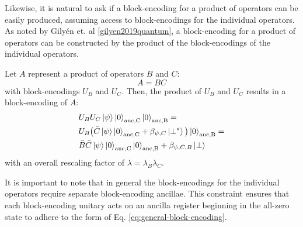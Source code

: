 Likewise, it is natural to ask if a block-encoding for a product of operators can be easily produced, assuming access to block-encodings for the individual operators.
As noted by Gilyén et. al \ref{gilyen2019quantum}, a block-encoding for a product of operators can be constructed by the product of the block-encodings of the individual operators.

Let $A$ represent a product of operators $B$ and $C$:
\begin{equation}
    \label{eq:product}
    A = BC
\end{equation}
with block-encodings $U_B$ and $U_C$.
Then, the product of $U_B$ and $U_C$ results in a block-encoding of $A$:
\begin{equation}
    \begin{split}
        &U_B U_C \ket{\psi} \ket{0}_\text{anc,C}\ket{0}_\text{anc,B} = \\
        &U_B \big(\bar{C} \ket{\psi} \ket{0}_\text{anc,C} + \beta_{\psi, C} \ket{\perp^*}\big)\ket{0}_\text{anc,B} = \\
        &\bar{B} \bar{C} \ket{\psi} \ket{0}_\text{anc,C} \ket{0}_\text{anc,B} + \beta_{\psi, C, B} \ket{\perp}
    \end{split}
\end{equation}
with an overall rescaling factor of $\lambda = \lambda_B \lambda_C$.

It is important to note that in general the block-encodings for the individual operators require separate block-encoding ancillae.
This constraint ensures that each block-encoding unitary acts on an ancilla register beginning in the all-zero state to adhere to the form of Eq. \ref{eq:general-block-encoding}.